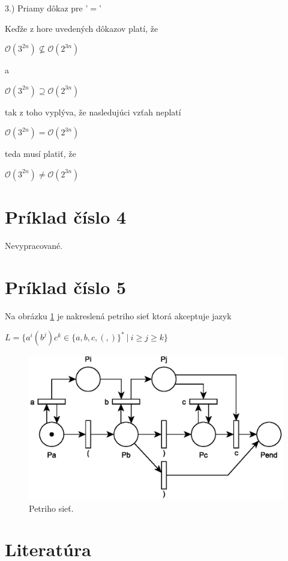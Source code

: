 \documentclass[11pt,a4paper]{article}
\begin{document}
\hspace{5mm}3.) Priamy dôkaz pre '$=$'

\begin{flushright}
\begin{minipage}{0.92\textwidth}
  Keďže z hore uvedených dôkazov platí, že
  \begin{center}
    $\mathcal{O}(3^{2n}) \nsubseteq \mathcal{O}(2^{3n})$
  \end{center}
  a
  \begin{center}
    $\mathcal{O}(3^{2n}) \supseteq \mathcal{O}(2^{3n})$
  \end{center}
  tak z toho vyplýva, že nasledujúci vzťah neplatí
  \begin{center}
    $\mathcal{O}(3^{2n}) = \mathcal{O}(2^{3n})$
  \end{center}
  teda musí platiť, že
  \begin{center}
    $\mathcal{O}(3^{2n}) \neq \mathcal{O}(2^{3n})$
  \end{center}
\end{minipage}
\end{flushright}

\newpage
\section{Príklad číslo 4}

Nevypracované.

\newpage
\section{Príklad číslo 5}

Na obrázku \ref{fig:pn} je nakreslená petriho sieť ktorá akceptuje jazyk

\begin{center}
$L = \{a^i(b^j)c^k \in \{a,b,c,(,)\}^* \ | \ i \geq j \geq k\}$
\end{center}

\begin{figure}[H]
  \centering
  \includegraphics[scale=1]{img/pn.eps}
  \caption{Petriho sieť.}
  \label{fig:pn}
\end{figure}


\newpage
\section{Literatúra}

\begin{flushleft}
    
\end{flushleft}
\end{document}
